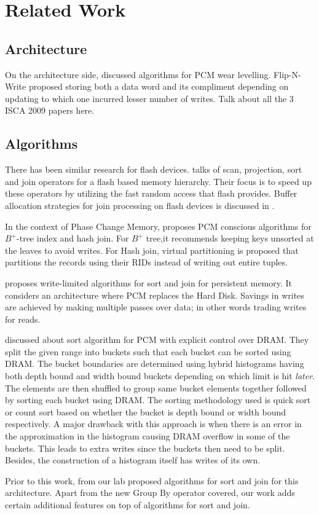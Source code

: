 \chapter{Related Work}
\label{relWork}
\section{Architecture}
On the architecture side, \cite{qureshi} discussed algorithms for PCM wear levelling. Flip-N-Write proposed storing both a data word and its compliment depending on updating to which one incurred lesser number of writes. Talk about all the 3 ISCA 2009 papers here.  


\section{Algorithms}
There has been similar research for flash devices. \cite{graefe} talks of scan, projection, sort and join operators for a flash based memory hierarchy. Their focus is to speed up these operators by utilizing the fast random access that flash provides. Buffer allocation strategies for join processing on flash devices is discussed in \cite{patel}.

In the context of Phase Change Memory, \cite{chen} proposes PCM conscious algorithms for $B^+$-tree index and hash join. For $B^+$ tree,it recommends keeping keys unsorted at the leaves to avoid writes. For Hash join, virtual partitioning is proposed that partitions the records using their RIDs instead of writing out entire tuples.

 \cite{viglas} proposes write-limited algorithms for sort and join for persistent memory. It considers an architecture where PCM replaces the Hard Disk. Savings in writes are achieved by making multiple passes over data; in other words trading writes for reads. 

\cite{vamsi} discussed about sort algorithm for PCM with explicit control over DRAM. They split the given range into buckets such that each bucket can be sorted using DRAM. The bucket boundaries are determined using hybrid histograms having both depth bound and width bound buckets depending on which limit is hit \textit{later}. The elements are then shuffled to group same bucket elements together followed by sorting each bucket using DRAM. The sorting methodology used is quick sort or count sort based on whether the bucket is depth bound or width bound respectively. A major drawback with this approach is when there is an error in the approximation in the histogram causing DRAM overflow in some of the buckets. This leads to extra writes since the buckets then need to be split. Besides, the construction of a histogram itself has writes of its own.

Prior to this work, \cite{abhimanyu} from our lab proposed algorithms for sort and join for this architecture. Apart from the new Group By operator covered, our work adds certain additional features on top of algorithms for sort and join.







